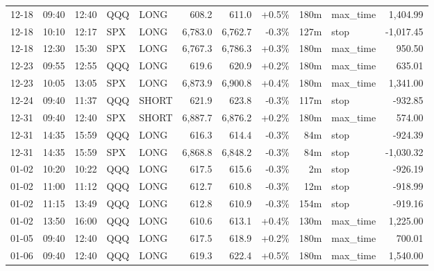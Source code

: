 \documentclass[11pt,a4paper,twoside]{article}
\begin{document}
\begin{center}
\begin{longtable}{>{\color{txtmain}}l l l l l r r r r >{\color{txtmain}}l r}
12-18 & 09:40 & 12:40 & QQQ & LONG & 608.2 & 611.0 & \textcolor{wingreen}{+0.5\%} & 180m & max\_time & \textcolor{wingreen}{1,404.99} \\
12-18 & 10:10 & 12:17 & SPX & LONG & 6,783.0 & 6,762.7 & \textcolor{lossred}{-0.3\%} & 127m & stop & \textcolor{lossred}{-1,017.45} \\
12-18 & 12:30 & 15:30 & SPX & LONG & 6,767.3 & 6,786.3 & \textcolor{wingreen}{+0.3\%} & 180m & max\_time & \textcolor{wingreen}{950.50} \\
12-23 & 09:55 & 12:55 & QQQ & LONG & 619.6 & 620.9 & \textcolor{wingreen}{+0.2\%} & 180m & max\_time & \textcolor{wingreen}{635.01} \\
12-23 & 10:05 & 13:05 & SPX & LONG & 6,873.9 & 6,900.8 & \textcolor{wingreen}{+0.4\%} & 180m & max\_time & \textcolor{wingreen}{1,341.00} \\
12-24 & 09:40 & 11:37 & QQQ & SHORT & 621.9 & 623.8 & \textcolor{lossred}{-0.3\%} & 117m & stop & \textcolor{lossred}{-932.85} \\
12-31 & 09:40 & 12:40 & SPX & SHORT & 6,887.7 & 6,876.2 & \textcolor{wingreen}{+0.2\%} & 180m & max\_time & \textcolor{wingreen}{574.00} \\
12-31 & 14:35 & 15:59 & QQQ & LONG & 616.3 & 614.4 & \textcolor{lossred}{-0.3\%} & 84m & stop & \textcolor{lossred}{-924.39} \\
12-31 & 14:35 & 15:59 & SPX & LONG & 6,868.8 & 6,848.2 & \textcolor{lossred}{-0.3\%} & 84m & stop & \textcolor{lossred}{-1,030.32} \\
01-02 & 10:20 & 10:22 & QQQ & LONG & 617.5 & 615.6 & \textcolor{lossred}{-0.3\%} & 2m & stop & \textcolor{lossred}{-926.19} \\
01-02 & 11:00 & 11:12 & QQQ & LONG & 612.7 & 610.8 & \textcolor{lossred}{-0.3\%} & 12m & stop & \textcolor{lossred}{-918.99} \\
01-02 & 11:15 & 13:49 & QQQ & LONG & 612.8 & 610.9 & \textcolor{lossred}{-0.3\%} & 154m & stop & \textcolor{lossred}{-919.16} \\
01-02 & 13:50 & 16:00 & QQQ & LONG & 610.6 & 613.1 & \textcolor{wingreen}{+0.4\%} & 130m & max\_time & \textcolor{wingreen}{1,225.00} \\
01-05 & 09:40 & 12:40 & QQQ & LONG & 617.5 & 618.9 & \textcolor{wingreen}{+0.2\%} & 180m & max\_time & \textcolor{wingreen}{700.01} \\
01-06 & 09:40 & 12:40 & QQQ & LONG & 619.3 & 622.4 & \textcolor{wingreen}{+0.5\%} & 180m & max\_time & \textcolor{wingreen}{1,540.00} \\

\end{longtable}
\end{center}
\end{document}
